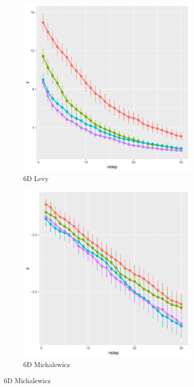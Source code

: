 \documentclass [PhD] {package/uclathes}
\begin{document}
\begin{figure}
\begin{subfigure}[b]{0.3\textwidth}
\end{subfigure}
\begin{subfigure}[b]{0.3\textwidth}
\centering
\caption{6D Levy}
\includegraphics[width=\textwidth]{chapters/EGO/pdfs/levy6_lineplot}
\end{subfigure}
\begin{subfigure}[b]{0.3\textwidth}
\centering
\caption{6D Michalewicz}
\includegraphics[width=\textwidth]{chapters/EGO/pdfs/michal6_lineplot}

\end{subfigure}
\end{figure}
\end{document}
